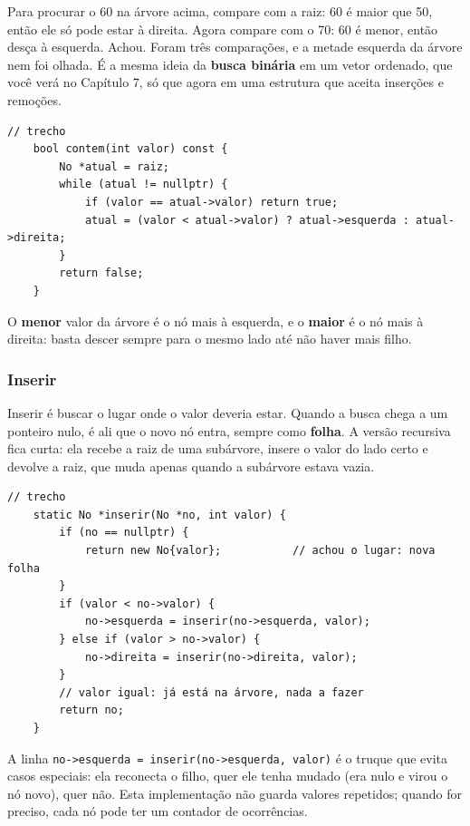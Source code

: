 Para procurar o 60 na árvore acima, compare com a raiz: 60 é maior que 50, então ele só pode estar à direita. Agora compare com o 70: 60 é menor, então desça à esquerda. Achou. Foram três comparações, e a metade esquerda da árvore nem foi olhada. É a mesma ideia da \textbf{busca binária} em um vetor ordenado, que você verá no Capítulo 7, só que agora em uma estrutura que aceita inserções e remoções.

\begin{codigo}
\begin{Verbatim}[breaklines=true, breaksymbolleft={}, fontsize=\footnotesize]
// trecho
    bool contem(int valor) const {
        No *atual = raiz;
        while (atual != nullptr) {
            if (valor == atual->valor) return true;
            atual = (valor < atual->valor) ? atual->esquerda : atual->direita;
        }
        return false;
    }
\end{Verbatim}
\end{codigo}

O \textbf{menor} valor da árvore é o nó mais à esquerda, e o \textbf{maior} é o nó mais à direita: basta descer sempre para o mesmo lado até não haver mais filho.

\subsubsection{Inserir}

Inserir é buscar o lugar onde o valor deveria estar. Quando a busca chega a um ponteiro nulo, é ali que o novo nó entra, sempre como \textbf{folha}. A versão recursiva fica curta: ela recebe a raiz de uma subárvore, insere o valor do lado certo e devolve a raiz, que muda apenas quando a subárvore estava vazia.

\begin{codigo}
\begin{Verbatim}[breaklines=true, breaksymbolleft={}, fontsize=\footnotesize]
// trecho
    static No *inserir(No *no, int valor) {
        if (no == nullptr) {
            return new No{valor};           // achou o lugar: nova folha
        }
        if (valor < no->valor) {
            no->esquerda = inserir(no->esquerda, valor);
        } else if (valor > no->valor) {
            no->direita = inserir(no->direita, valor);
        }
        // valor igual: já está na árvore, nada a fazer
        return no;
    }
\end{Verbatim}
\end{codigo}

A linha \texttt{no->esquerda = inserir(no->esquerda, valor)} é o truque que evita casos especiais: ela reconecta o filho, quer ele tenha mudado (era nulo e virou o nó novo), quer não. Esta implementação não guarda valores repetidos; quando for preciso, cada nó pode ter um contador de ocorrências.

